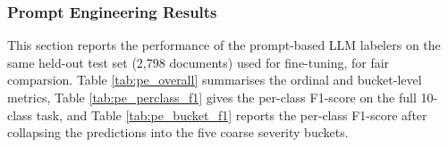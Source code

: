 \documentclass[conference]{IEEEtran}
\makeatletter
\let\end\a@l@end
\makeatother
\begin{document}
\subsubsection{Prompt Engineering Results}
This section reports the performance of the prompt-based LLM labelers on the same held-out test set (2,798 documents) used for fine-tuning, for fair comparsion. Table \ref{tab:pe_overall} summarises the ordinal and bucket-level metrics, Table \ref{tab:pe_perclass_f1} gives the per-class F1-score on the full 10-class task, and Table \ref{tab:pe_bucket_f1} reports the per-class F1-score after collapsing the predictions into the five coarse severity buckets.

\begin{table}[ht]
\centering
\caption{Overall prompt-engineering performance on the test set}
\label{tab:pe_overall}
\end{table}
\end{document}
